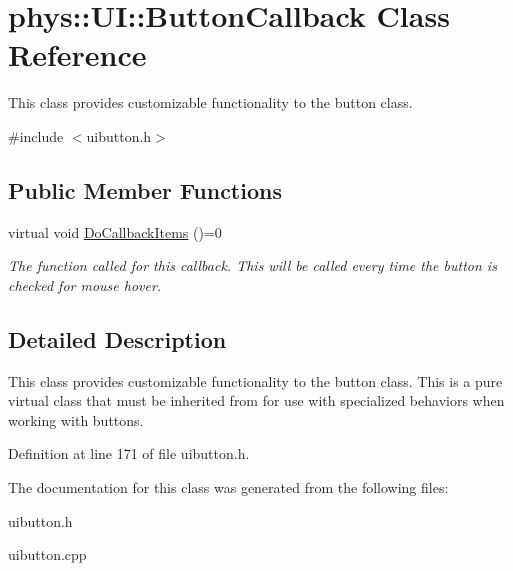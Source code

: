 \hypertarget{classphys_1_1UI_1_1ButtonCallback}{
\section{phys::UI::ButtonCallback Class Reference}
\label{df/dcb/classphys_1_1UI_1_1ButtonCallback}
}


This class provides customizable functionality to the button class.  




{\ttfamily \#include $<$uibutton.h$>$}

\subsection*{Public Member Functions}
\begin{DoxyCompactItemize}
\item 
\hypertarget{classphys_1_1UI_1_1ButtonCallback_a34e416ce289a5a786b59ccbd44f5dfda}{
virtual void \hyperlink{classphys_1_1UI_1_1ButtonCallback_a34e416ce289a5a786b59ccbd44f5dfda}{DoCallbackItems} ()=0}
\label{df/dcb/classphys_1_1UI_1_1ButtonCallback_a34e416ce289a5a786b59ccbd44f5dfda}

\begin{DoxyCompactList}\small\item\em The function called for this callback. This will be called every time the button is checked for mouse hover. \item\end{DoxyCompactList}\end{DoxyCompactItemize}


\subsection{Detailed Description}
This class provides customizable functionality to the button class. This is a pure virtual class that must be inherited from for use with specialized behaviors when working with buttons. 

Definition at line 171 of file uibutton.h.



The documentation for this class was generated from the following files:\begin{DoxyCompactItemize}
\item 
uibutton.h\item 
uibutton.cpp\end{DoxyCompactItemize}
